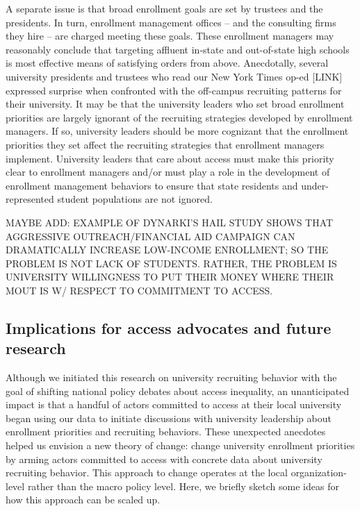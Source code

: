 \documentclass[twoside]{article}
\begin{document}
A separate issue is that broad enrollment goals are set by trustees and the presidents.  In turn, enrollment management offices -- and the consulting firms they hire -- are charged meeting these goals.  These enrollment managers may reasonably conclude that targeting affluent in-state and out-of-state high schools is most effective means of satisfying orders from above.  Anecdotally, several university presidents and trustees who read our New York Times op-ed [LINK] expressed surprise when confronted with the off-campus recruiting patterns for their university.  It may be that the university leaders who set broad enrollment priorities are largely ignorant of the recruiting strategies developed by enrollment managers.  If so, university leaders should be more cognizant that the enrollment priorities they set affect the recruiting strategies that enrollment managers implement.  University leaders that care about access must make this priority clear to enrollment managers and/or must play a role in the development of enrollment management behaviors to ensure that state residents and under-represented student populations are not ignored.

MAYBE ADD: EXAMPLE OF DYNARKI'S HAIL STUDY SHOWS THAT AGGRESSIVE OUTREACH/FINANCIAL AID CAMPAIGN CAN DRAMATICALLY INCREASE LOW-INCOME ENROLLMENT; SO THE PROBLEM IS NOT LACK OF STUDENTS. RATHER, THE PROBLEM IS UNIVERSITY WILLINGNESS TO PUT THEIR MONEY WHERE THEIR MOUT IS W/ RESPECT TO COMMITMENT TO ACCESS.

\subsection*{Implications for access advocates and future research}

Although we initiated this research on university recruiting behavior with the goal of shifting national policy debates about access inequality, an unanticipated impact is that a handful of actors committed to access at their local university began using our data to initiate discussions with university leadership about enrollment priorities and recruiting behaviors.  These unexpected anecdotes helped us envision a new theory of change: change university enrollment priorities by arming actors committed to access with concrete data about university recruiting behavior.  This approach to change operates at the local organization-level rather than the macro policy level. Here, we briefly sketch some ideas for how this approach can be scaled up.
\end{document}
